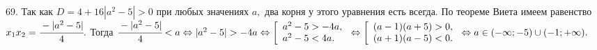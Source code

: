 69. Так как $D=4+16|a^2-5|>0$ при любых значениях $a,$ два корня у этого уравнения есть всегда. По теореме Виета имеем равенство $x_1x_2=\cfrac{-|a^2-5|}{4}.$ Тогда $\cfrac{-|a^2-5|}{4}<a\Leftrightarrow |a^2-5|>-4a \Leftrightarrow \left[\begin{array}{l} a^2-5>-4a,\\ a^2-5<4a.\end{array}\right.\Leftrightarrow \left[\begin{array}{l} (a-1)(a+5)>0,\\ (a+1)(a-5)<0.\end{array}\right.\Leftrightarrow a\in(-\infty;-5)\cup(-1;+\infty).$\\

